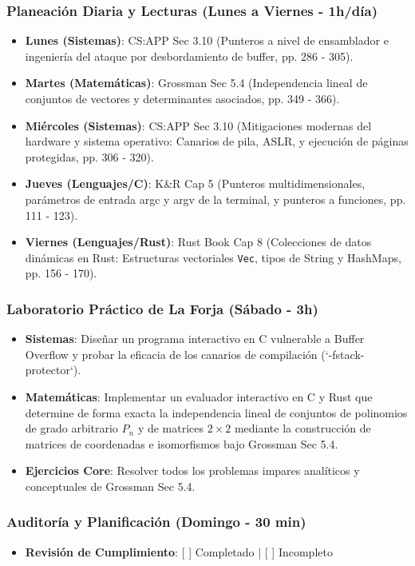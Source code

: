 \documentclass[11pt, a4paper]{article}
\begin{document}
\subsubsection{Planeación Diaria y Lecturas (Lunes a Viernes - 1h/día)}
\begin{itemize}
    \item \textbf{Lunes (Sistemas)}: CS:APP Sec 3.10 (Punteros a nivel de ensamblador e ingeniería del ataque por desbordamiento de buffer, pp. 286 - 305).
    \item \textbf{Martes (Matemáticas)}: Grossman Sec 5.4 (Independencia lineal de conjuntos de vectores y determinantes asociados, pp. 349 - 366).
    \item \textbf{Miércoles (Sistemas)}: CS:APP Sec 3.10 (Mitigaciones modernas del hardware y sistema operativo: Canarios de pila, ASLR, y ejecución de páginas protegidas, pp. 306 - 320).
    \item \textbf{Jueves (Lenguajes/C)}: K\&R Cap 5 (Punteros multidimensionales, parámetros de entrada argc y argv de la terminal, y punteros a funciones, pp. 111 - 123).
    \item \textbf{Viernes (Lenguajes/Rust)}: Rust Book Cap 8 (Colecciones de datos dinámicas en Rust: Estructuras vectoriales \texttt{Vec}, tipos de String y HashMaps, pp. 156 - 170).
\end{itemize}

\subsubsection{Laboratorio Práctico de La Forja (Sábado - 3h)}
\begin{itemize}
    \item \textbf{Sistemas}: Diseñar un programa interactivo en C vulnerable a Buffer Overflow y probar la eficacia de los canarios de compilación (`-fstack-protector`).
    \item \textbf{Matemáticas}: Implementar un evaluador interactivo en C y Rust que determine de forma exacta la independencia lineal de conjuntos de polinomios de grado arbitrario $P_n$ y de matrices $2 \times 2$ mediante la construcción de matrices de coordenadas e isomorfismos bajo Grossman Sec 5.4.
    \item \textbf{Ejercicios Core}: Resolver todos los problemas impares analíticos y conceptuales de Grossman Sec 5.4.
\end{itemize}

\subsubsection{Auditoría y Planificación (Domingo - 30 min)}
\begin{itemize}
    \item \textbf{Revisión de Cumplimiento}: [ ] Completado | [ ] Incompleto
\end{itemize}
\end{document}

